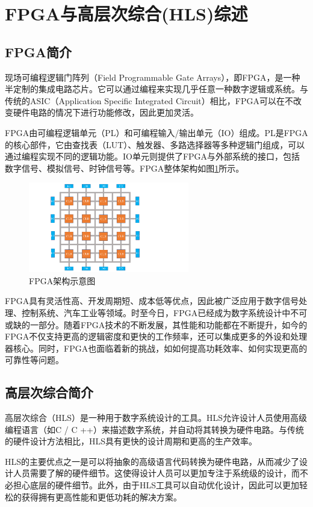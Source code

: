 \section{FPGA与高层次综合(HLS)综述}
\subsection{FPGA简介}
现场可编程逻辑门阵列（Field Programmable Gate Arrays），即FPGA，是一种半定制的集成电路芯片。它可以通过编程来实现几乎任意一种数字逻辑或系统\cite{kuon2008fpga}。与传统的ASIC（Application Specific Integrated Circuit）相比，FPGA可以在不改变硬件电路的情况下进行功能修改，因此更加灵活。 

FPGA由可编程逻辑单元（PL）和可编程输入/输出单元（IO）组成。PL是FPGA的核心部件，它由查找表（LUT）、触发器、多路选择器等多种逻辑门组成，可以通过编程实现不同的逻辑功能。IO单元则提供了FPGA与外部系统的接口，包括数字信号、模拟信号、时钟信号等。FPGA整体架构如图\ref{fig:FPGA}所示。
\begin{figure}
    \centering
    \includegraphics[width=7cm]{figures/FPGA.pdf}
    \caption{FPGA架构示意图}
    \label{fig:FPGA}
\end{figure}

FPGA具有灵活性高、开发周期短、成本低等优点，因此被广泛应用于数字信号处理、控制系统、汽车工业等领域。时至今日，FPGA已经成为数字系统设计中不可或缺的一部分。随着FPGA技术的不断发展，其性能和功能都在不断提升，如今的FPGA不仅支持更高的逻辑密度和更快的工作频率，还可以集成更多的外设和处理器核心。同时，FPGA也面临着新的挑战，如如何提高功耗效率、如何实现更高的可靠性等问题。

\subsection{高层次综合简介}

高层次综合（HLS）是一种用于数字系统设计的工具。HLS允许设计人员使用高级编程语言（如C / C ++）来描述数字系统，并自动将其转换为硬件电路。与传统的硬件设计方法相比，HLS具有更快的设计周期和更高的生产效率。

HLS的主要优点之一是可以将抽象的高级语言代码转换为硬件电路，从而减少了设计人员需要了解的硬件细节。这使得设计人员可以更加专注于系统级的设计，而不必担心底层的硬件细节。此外，由于HLS工具可以自动优化设计，因此可以更加轻松的获得拥有更高性能和更低功耗的解决方案。

